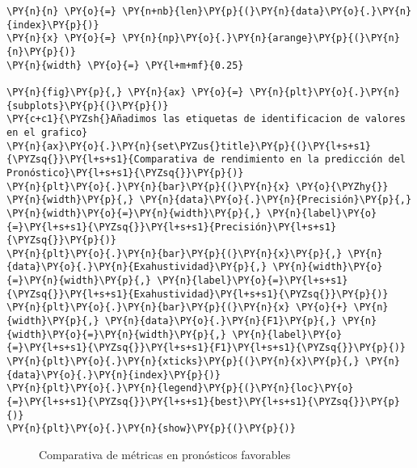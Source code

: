     \begin{tcolorbox}[breakable, size=fbox, boxrule=1pt, pad at break*=1mm,colback=cellbackground, colframe=cellborder]
\begin{Verbatim}[commandchars=\\\{\}]
\PY{n}{n} \PY{o}{=} \PY{n+nb}{len}\PY{p}{(}\PY{n}{data}\PY{o}{.}\PY{n}{index}\PY{p}{)}
\PY{n}{x} \PY{o}{=} \PY{n}{np}\PY{o}{.}\PY{n}{arange}\PY{p}{(}\PY{n}{n}\PY{p}{)}
\PY{n}{width} \PY{o}{=} \PY{l+m+mf}{0.25}

\PY{n}{fig}\PY{p}{,} \PY{n}{ax} \PY{o}{=} \PY{n}{plt}\PY{o}{.}\PY{n}{subplots}\PY{p}{(}\PY{p}{)}
\PY{c+c1}{\PYZsh{}Añadimos las etiquetas de identificacion de valores en el grafico}
\PY{n}{ax}\PY{o}{.}\PY{n}{set\PYZus{}title}\PY{p}{(}\PY{l+s+s1}{\PYZsq{}}\PY{l+s+s1}{Comparativa de rendimiento en la predicción del Pronóstico}\PY{l+s+s1}{\PYZsq{}}\PY{p}{)}
\PY{n}{plt}\PY{o}{.}\PY{n}{bar}\PY{p}{(}\PY{n}{x} \PY{o}{\PYZhy{}} \PY{n}{width}\PY{p}{,} \PY{n}{data}\PY{o}{.}\PY{n}{Precisión}\PY{p}{,} \PY{n}{width}\PY{o}{=}\PY{n}{width}\PY{p}{,} \PY{n}{label}\PY{o}{=}\PY{l+s+s1}{\PYZsq{}}\PY{l+s+s1}{Precisión}\PY{l+s+s1}{\PYZsq{}}\PY{p}{)}
\PY{n}{plt}\PY{o}{.}\PY{n}{bar}\PY{p}{(}\PY{n}{x}\PY{p}{,} \PY{n}{data}\PY{o}{.}\PY{n}{Exahustividad}\PY{p}{,} \PY{n}{width}\PY{o}{=}\PY{n}{width}\PY{p}{,} \PY{n}{label}\PY{o}{=}\PY{l+s+s1}{\PYZsq{}}\PY{l+s+s1}{Exahustividad}\PY{l+s+s1}{\PYZsq{}}\PY{p}{)}
\PY{n}{plt}\PY{o}{.}\PY{n}{bar}\PY{p}{(}\PY{n}{x} \PY{o}{+} \PY{n}{width}\PY{p}{,} \PY{n}{data}\PY{o}{.}\PY{n}{F1}\PY{p}{,} \PY{n}{width}\PY{o}{=}\PY{n}{width}\PY{p}{,} \PY{n}{label}\PY{o}{=}\PY{l+s+s1}{\PYZsq{}}\PY{l+s+s1}{F1}\PY{l+s+s1}{\PYZsq{}}\PY{p}{)}
\PY{n}{plt}\PY{o}{.}\PY{n}{xticks}\PY{p}{(}\PY{n}{x}\PY{p}{,} \PY{n}{data}\PY{o}{.}\PY{n}{index}\PY{p}{)}
\PY{n}{plt}\PY{o}{.}\PY{n}{legend}\PY{p}{(}\PY{n}{loc}\PY{o}{=}\PY{l+s+s1}{\PYZsq{}}\PY{l+s+s1}{best}\PY{l+s+s1}{\PYZsq{}}\PY{p}{)}
\PY{n}{plt}\PY{o}{.}\PY{n}{show}\PY{p}{(}\PY{p}{)}
\end{Verbatim}
\end{tcolorbox}

\begin{center}
    	\begin{figure}[H]
	\centering
	\caption{Comparativa de métricas en pronósticos favorables}
	\label{fig:cmpf}
	\end{figure}
\end{center}
    

